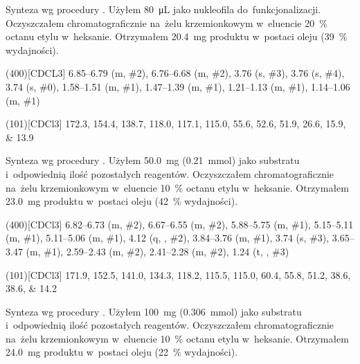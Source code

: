 Synteza wg procedury .
Użyłem \SI{80}{\uL}  jako nukleofila do~funkcjonalizacji.
Oczyszczałem chromatograficznie na~żelu krzemionkowym w~eluencie \SI{20}{\percent} octanu
  etylu w~heksanie.
Otrzymałem \SI{20.4}{\mg} produktu w~postaci oleju (\SI{39}{\percent} wydajności).
\begin{fullexp}
  \NMR(400)[CDCL3] \numrange{6.85}{6.79} (m, \#{2}), \numrange{6.76}{6.68} (m, \#{2}), \num{3.76} (s, \#{3}), \num{3.76} (s, \#{4}), \num{3.74} (s, \#{0}), \numrange{1.58}{1.51} (m, \#{1}), \numrange{1.47}{1.39} (m, \#{1}), \numrange{1.21}{1.13} (m, \#{1}), \numrange{1.14}{1.06} (m, \#{1})\par\noindent
  (101)[CDCl3] \numlist{172.3; 154.4; 138.7; 118.0; 117.1; 115.0; 55.6; 52.6; 51.9; 26.6; 15.9; 13.9}
\end{fullexp}

Synteza wg procedury .
Użyłem \SI{50.0}{\mg} (\SI{0.21}{\milli\mole})  jako substratu
  i~odpowiednią ilość pozostałych reagentów.
Oczyszczałem chromatograficznie na~żelu krzemionkowym w~eluencie \SI{10}{\percent} octanu
  etylu w~heksanie.
Otrzymałem \SI{23.0}{\mg} produktu w~postaci oleju (\SI{42}{\percent} wydajności).

\begin{fullexp}
  \NMR(400)[CDCl3] \numrange{6.82}{6.73} (m, \#{2}), \numrange{6.67}{6.55} (m, \#{2}), \numrange{5.88}{5.75} (m, \#{1}), \numrange{5.15}{5.11} (m, \#{1}), \numrange{5.11}{5.06} (m, \#{1}), \num{4.12} (q, , \#{2}), \numrange{3.84}{3.76} (m, \#{1}), \num{3.74} (s, \#{3}), \numrange{3.65}{3.47} (m, \#{1}), \numrange{2.59}{2.43} (m, \#{2}), \numrange{2.41}{2.28} (m, \#{2}), \num{1.24} (t, , \#{3})\par\noindent
  (101)[CDCl3] \numlist{171.9; 152.5; 141.0; 134.3; 118.2; 115.5; 115.0; 60.4; 55.8; 51.2; 38.6; 38.6; 14.2}
\end{fullexp}


Synteza wg procedury .
Użyłem \SI{100}{\mg} (\SI{0.306}{\milli\mole})  jako substratu
  i~odpowiednią ilość pozostałych reagentów.
Oczyszczałem chromatograficznie na~żelu krzemionkowym w~eluencie \SI{10}{\percent} octanu
  etylu w~heksanie.
Otrzymałem \SI{24.0}{\mg} produktu w~postaci oleju (\SI{22}{\percent} wydajności).

